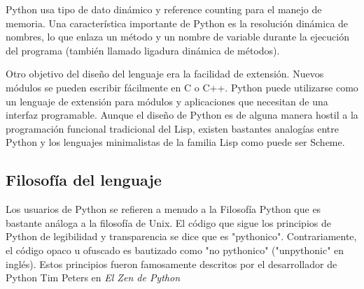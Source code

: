 \documentclass[a4paper]{report}
\begin{document}
Python usa tipo de dato dinámico y reference counting para el manejo de
memoria. 
Una característica importante de Python es la resolución dinámica de nombres, 
lo que enlaza un método y un nombre de variable durante la ejecución del
programa 
(también llamado ligadura dinámica de métodos).

Otro objetivo del diseño del lenguaje era la facilidad de extensión. 
Nuevos módulos se pueden escribir fácilmente en C o C++. 
Python puede utilizarse como un lenguaje de extensión para módulos y 
aplicaciones que necesitan de una interfaz programable. Aunque el diseño de
Python es 
de alguna manera hostil a la programación funcional tradicional del Lisp,
existen bastantes analogías 
entre Python y los lenguajes minimalistas de la familia Lisp como puede ser
Scheme.

\subsection*{Filosofía del lenguaje}

Los usuarios de Python se refieren a menudo a la Filosofía Python que es
bastante análoga a la filosofía de Unix. El código que sigue los principios de
Python de legibilidad y transparencia se dice que es "pythonico".
Contrariamente, el código opaco u ofuscado es bautizado como "no pythonico"
("unpythonic" en inglés). Estos principios fueron famosamente descritos por el
desarrollador de Python Tim Peters en \emph{El Zen de Python}
\end{document}
